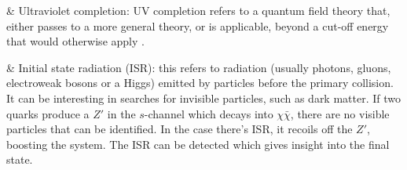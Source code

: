 \begin{easylist}[itemize]
& Ultraviolet completion: UV completion refers to a quantum field theory that, either passes to a more general theory, or is applicable, beyond a cut-off energy that would otherwise apply \cite{Shore:2007um}.

& Initial state radiation (ISR): this refers to radiation (usually photons, gluons, electroweak bosons or a Higgs) emitted by particles before the primary collision. It can be interesting in searches for invisible particles, such as dark matter. If two quarks produce a $Z'$ in the $s$-channel which decays into $\chi\bar{\chi}$, there are no visible particles that can be identified. In the case there's ISR, it recoils off the $Z'$, boosting the system. The ISR can be detected which gives insight into the final state.

\end{easylist}
